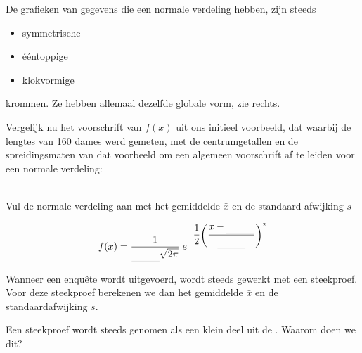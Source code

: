 \documentclass[12pt,twoside]{article}
\begin{document}
{\begin{minipage}{0.5\textwidth}
De grafieken van gegevens die een normale verdeling hebben, zijn steeds
\begin{itemize}
  \item symmetrische
  \item ééntoppige
  \item klokvormige
\end{itemize}
krommen. Ze hebben allemaal dezelfde globale vorm, zie rechts.
\end{minipage}
\begin{minipage}{0.5\textwidth}
\begin{center}
\end{center}
\end{minipage}

Vergelijk nu het voorschrift van $f(x)$ uit ons initieel voorbeeld, dat waarbij de lengtes van 160 dames werd gemeten, met de centrumgetallen en de spreidingsmaten van dat voorbeeld om een algemeen voorschrift af te leiden voor een normale verdeling:

\begin{oefening}\\
Vul de normale verdeling aan met het gemiddelde $\bar{x}$ en de standaard afwijking $s$

$$f(x)=\dfrac{1}{\arule{1cm}{\sqrt{2\pi}}}\;e^{-\dfrac{1}{2}\left(\dfrac{x-\arule{1cm}}{\arule{1cm}}\right)^2}$$
\end{oefening}

Wanneer een enquête wordt uitgevoerd, wordt steeds gewerkt met een steekproef. Voor deze steekproef berekenen we dan het gemiddelde $\bar{x}$ en de standaardafwijking $s$.

\begin{oefening}
Een steekproef wordt steeds genomen als een klein deel uit de \arule{5cm}. Waarom doen we dit?
\end{oefening}

}
\end{document}
